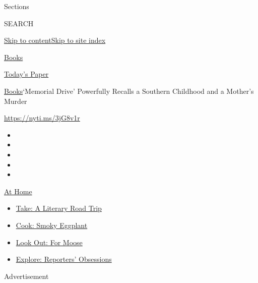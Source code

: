 Sections

SEARCH

\protect\hyperlink{site-content}{Skip to
content}\protect\hyperlink{site-index}{Skip to site index}

\href{https://www.nytimes.com/section/books}{Books}

\href{https://myaccount.nytimes.com/auth/login?response_type=cookie\&client_id=vi}{}

\href{https://www.nytimes.com/section/todayspaper}{Today's Paper}

\href{/section/books}{Books}\textbar{}`Memorial Drive' Powerfully
Recalls a Southern Childhood and a Mother's Murder

\url{https://nyti.ms/3jG8v1r}

\begin{itemize}
\item
\item
\item
\item
\item
\end{itemize}

\href{https://www.nytimes.com/spotlight/at-home?action=click\&pgtype=Article\&state=default\&region=TOP_BANNER\&context=at_home_menu}{At
Home}

\begin{itemize}
\tightlist
\item
  \href{https://www.nytimes.com/2020/07/28/books/time-for-a-literary-road-trip.html?action=click\&pgtype=Article\&state=default\&region=TOP_BANNER\&context=at_home_menu}{Take:
  A Literary Road Trip}
\item
  \href{https://www.nytimes.com/2020/07/29/magazine/bored-with-your-home-cooking-some-smoky-eggplant-will-fix-that.html?action=click\&pgtype=Article\&state=default\&region=TOP_BANNER\&context=at_home_menu}{Cook:
  Smoky Eggplant}
\item
  \href{https://www.nytimes.com/2020/07/27/travel/moose-michigan-isle-royale.html?action=click\&pgtype=Article\&state=default\&region=TOP_BANNER\&context=at_home_menu}{Look
  Out: For Moose}
\item
  \href{https://www.nytimes.com/interactive/2020/at-home/even-more-reporters-editors-diaries-lists-recommendations.html?action=click\&pgtype=Article\&state=default\&region=TOP_BANNER\&context=at_home_menu}{Explore:
  Reporters' Obsessions}
\end{itemize}

Advertisement

